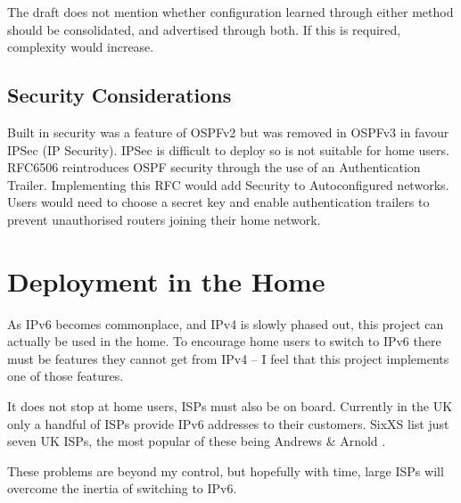 \documentclass[12pt,a4paper,twoside]{report}
\begin{document}
The draft does not mention whether configuration learned through either method
should be consolidated, and advertised through both. If this is required,
complexity would increase.

\subsection{Security Considerations} 
Built in security was a feature of OSPFv2 but was removed in OSPFv3 in favour
IPSec (IP Security). IPSec is difficult to deploy so is not suitable for home
users. RFC6506 reintroduces OSPF security through the use of an Authentication
Trailer\cite{rfc6506}. Implementing this RFC would add Security to
Autoconfigured networks. Users would need to choose a secret key and enable
authentication trailers to prevent unauthorised routers joining their home
network.  

\section{Deployment in the Home}
As IPv6 becomes commonplace, and IPv4 is slowly phased out, this project can 
actually be used in the home. To encourage home users to switch to IPv6 there must 
be features they cannot get from IPv4 -- I feel that this project 
implements one of those features.

It does not stop at home users, ISPs must also be on board. Currently in the UK
only a handful of ISPs provide IPv6 addresses to their customers. SixXS list
just seven UK ISPs, the most popular of these being Andrews \& Arnold
\cite{SixXS}.

These problems are beyond my control, but hopefully with time, large ISPs will
overcome the inertia of switching to IPv6.

\raggedbottom
\pagebreak

\printnomenclature
{}
\raggedbottom
\pagebreak

{}
{}



\end{document}
